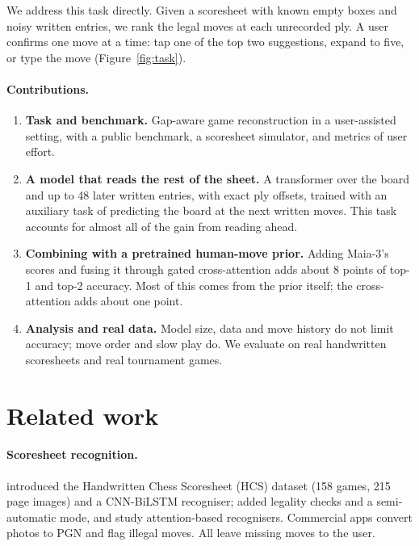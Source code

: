\documentclass[11pt]{article}
\begin{document}
We address this task directly. Given a scoresheet with known empty boxes and noisy written entries, we rank the legal moves at each unrecorded ply. A user confirms one move at a time: tap one of the top two suggestions, expand to five, or type the move (Figure~\ref{fig:task}).



\paragraph{Contributions.}
\begin{enumerate}
  \item \textbf{Task and benchmark.} Gap-aware game reconstruction in a user-assisted setting, with a public benchmark, a scoresheet simulator, and metrics of user effort.
  \item \textbf{A model that reads the rest of the sheet.} A transformer over the board and up to 48 later written entries, with exact ply offsets, trained with an auxiliary task of predicting the board at the next written moves. This task accounts for almost all of the gain from reading ahead.
  \item \textbf{Combining with a pretrained human-move prior.} Adding Maia-3's \citep{maia3} scores and fusing it through gated cross-attention adds about 8 points of top-1 and top-2 accuracy. Most of this comes from the prior itself; the cross-attention adds about one point.
  \item \textbf{Analysis and real data.} Model size, data and move history do not limit accuracy; move order and slow play do. We evaluate on real handwritten scoresheets and real tournament games.
\end{enumerate}

\section{Related work}

\paragraph{Scoresheet recognition.}
\citet{eicher2021hcs} introduced the Handwritten Chess Scoresheet (HCS) dataset (158 games, 215 page images) and a CNN-BiLSTM recogniser; \citet{majid2022digitization} added legality checks and a semi-automatic mode, and \citet{hayashi2022attention} study attention-based recognisers. Commercial apps convert photos to PGN and flag illegal moves. All leave missing moves to the user.
\end{document}
